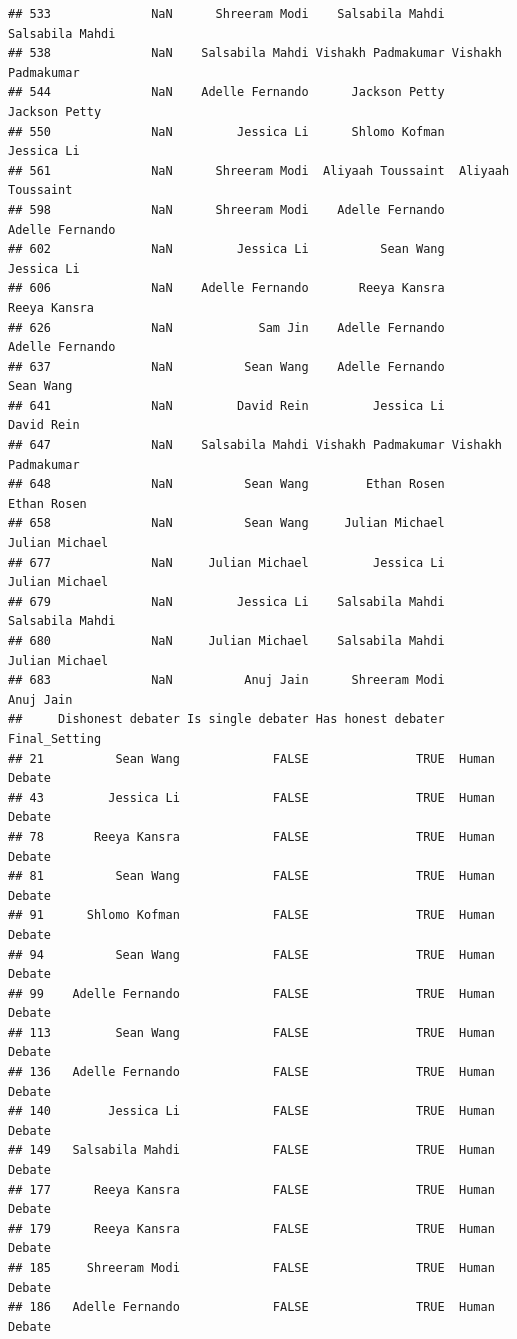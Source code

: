 \documentclass[
]{article}
\begin{document}
\begin{verbatim}
## 533              NaN      Shreeram Modi    Salsabila Mahdi    Salsabila Mahdi
## 538              NaN    Salsabila Mahdi Vishakh Padmakumar Vishakh Padmakumar
## 544              NaN    Adelle Fernando      Jackson Petty      Jackson Petty
## 550              NaN         Jessica Li      Shlomo Kofman         Jessica Li
## 561              NaN      Shreeram Modi  Aliyaah Toussaint  Aliyaah Toussaint
## 598              NaN      Shreeram Modi    Adelle Fernando    Adelle Fernando
## 602              NaN         Jessica Li          Sean Wang         Jessica Li
## 606              NaN    Adelle Fernando       Reeya Kansra       Reeya Kansra
## 626              NaN            Sam Jin    Adelle Fernando    Adelle Fernando
## 637              NaN          Sean Wang    Adelle Fernando          Sean Wang
## 641              NaN         David Rein         Jessica Li         David Rein
## 647              NaN    Salsabila Mahdi Vishakh Padmakumar Vishakh Padmakumar
## 648              NaN          Sean Wang        Ethan Rosen        Ethan Rosen
## 658              NaN          Sean Wang     Julian Michael     Julian Michael
## 677              NaN     Julian Michael         Jessica Li     Julian Michael
## 679              NaN         Jessica Li    Salsabila Mahdi    Salsabila Mahdi
## 680              NaN     Julian Michael    Salsabila Mahdi     Julian Michael
## 683              NaN          Anuj Jain      Shreeram Modi          Anuj Jain
##     Dishonest debater Is single debater Has honest debater Final_Setting
## 21          Sean Wang             FALSE               TRUE  Human Debate
## 43         Jessica Li             FALSE               TRUE  Human Debate
## 78       Reeya Kansra             FALSE               TRUE  Human Debate
## 81          Sean Wang             FALSE               TRUE  Human Debate
## 91      Shlomo Kofman             FALSE               TRUE  Human Debate
## 94          Sean Wang             FALSE               TRUE  Human Debate
## 99    Adelle Fernando             FALSE               TRUE  Human Debate
## 113         Sean Wang             FALSE               TRUE  Human Debate
## 136   Adelle Fernando             FALSE               TRUE  Human Debate
## 140        Jessica Li             FALSE               TRUE  Human Debate
## 149   Salsabila Mahdi             FALSE               TRUE  Human Debate
## 177      Reeya Kansra             FALSE               TRUE  Human Debate
## 179      Reeya Kansra             FALSE               TRUE  Human Debate
## 185     Shreeram Modi             FALSE               TRUE  Human Debate
## 186   Adelle Fernando             FALSE               TRUE  Human Debate

\end{verbatim}
\end{document}
